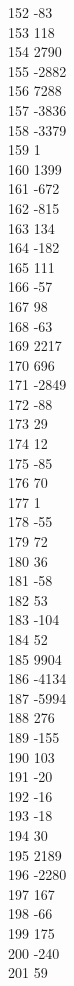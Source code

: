 { 152	-83 \\
 153	118 \\
 154	2790 \\
 155	-2882 \\
 156	7288 \\
 157	-3836 \\
 158	-3379 \\
 159	1 \\
 160	1399 \\
 161	-672 \\
 162	-815 \\
 163	134 \\
 164	-182 \\
 165	111 \\
 166	-57 \\
 167	98 \\
 168	-63 \\
 169	2217 \\
 170	696 \\
 171	-2849 \\
 172	-88 \\
 173	29 \\
 174	12 \\
 175	-85 \\
 176	70 \\
 177	1 \\
 178	-55 \\
 179	72 \\
 180	36 \\
 181	-58 \\
 182	53 \\
 183	-104 \\
 184	52 \\
 185	9904 \\
 186	-4134 \\
 187	-5994 \\
 188	276 \\
 189	-155 \\
 190	103 \\
 191	-20 \\
 192	-16 \\
 193	-18 \\
 194	30 \\
 195	2189 \\
 196	-2280 \\
 197	167 \\
 198	-66 \\
 199	175 \\
 200	-240 \\
 201	59 \\
}
